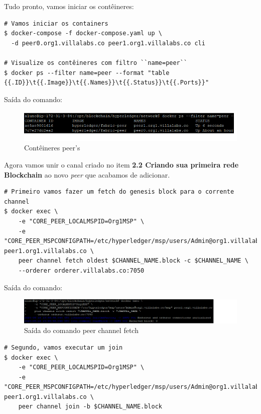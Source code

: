 \documentclass[a4paper,11pt]{article}
\begin{document}
Tudo pronto, vamos iniciar os contêineres:
\begin{lstlisting}
# Vamos iniciar os containers
$ docker-compose -f docker-compose.yaml up \
  -d peer0.org1.villalabs.co peer1.org1.villalabs.co cli

# Visualize os contêineres com filtro ``name=peer``
$ docker ps --filter name=peer --format "table {{.ID}}\t{{.Image}}\t{{.Names}}\t{{.Status}}\t{{.Ports}}"
\end{lstlisting}

Saída do comando:
\begin{figure}[H]
  \centering
  \includegraphics[width=1.1\textwidth]{imagens/conteineres-2.png}
  \caption{Contêineres peer's}
\end{figure}

Agora vamos unir o canal criado no item \textbf{2.2 Criando sua primeira rede Blockchain} ao novo \textit{peer} que acabamos de adicionar.
\begin{lstlisting}
# Primeiro vamos fazer um fetch do genesis block para o corrente channel
$ docker exec \
    -e "CORE_PEER_LOCALMSPID=Org1MSP" \
    -e "CORE_PEER_MSPCONFIGPATH=/etc/hyperledger/msp/users/Admin@org1.villalabs.co/msp" peer1.org1.villalabs.co \
    peer channel fetch oldest $CHANNEL_NAME.block -c $CHANNEL_NAME \
    --orderer orderer.villalabs.co:7050
\end{lstlisting}

Saída do comando:
\begin{figure}[H]
  \centering
  \includegraphics[width=1.1\textwidth]{imagens/output-org1-peer1-fetch.png}
  \caption{Saída do comando peer channel fetch}
\end{figure}

\begin{lstlisting}
# Segundo, vamos executar um join
$ docker exec \
    -e "CORE_PEER_LOCALMSPID=Org1MSP" \
    -e "CORE_PEER_MSPCONFIGPATH=/etc/hyperledger/msp/users/Admin@org1.villalabs.co/msp" peer1.org1.villalabs.co \
    peer channel join -b $CHANNEL_NAME.block
\end{lstlisting}
\end{document}
